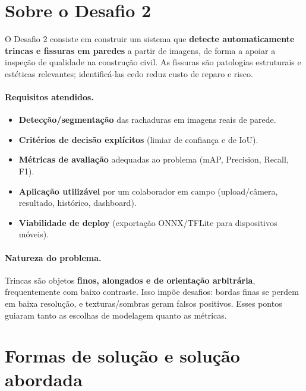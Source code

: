 \documentclass[11pt,a4paper]{article}
\begin{document}
\section{Sobre o Desafio 2}
O Desafio 2 consiste em construir um sistema que \textbf{detecte automaticamente trincas e
fissuras em paredes} a partir de imagens, de forma a apoiar a inspeção de qualidade na
construção civil. As fissuras são patologias estruturais e estéticas relevantes; identificá-las
cedo reduz custo de reparo e risco.

\paragraph{Requisitos atendidos.}
\begin{itemize}[leftmargin=1.4em]
  \item \textbf{Detecção/segmentação} das rachaduras em imagens reais de parede.
  \item \textbf{Critérios de decisão explícitos} (limiar de confiança e de IoU).
  \item \textbf{Métricas de avaliação} adequadas ao problema (mAP, Precision, Recall, F1).
  \item \textbf{Aplicação utilizável} por um colaborador em campo (upload/câmera, resultado,
        histórico, dashboard).
  \item \textbf{Viabilidade de deploy} (exportação ONNX/TFLite para dispositivos móveis).
\end{itemize}

\paragraph{Natureza do problema.} Trincas são objetos \textbf{finos, alongados e de orientação
arbitrária}, frequentemente com baixo contraste. Isso impõe desafios: bordas finas se perdem
em baixa resolução, e texturas/sombras geram falsos positivos. Esses pontos guiaram tanto as
escolhas de modelagem quanto as métricas.

\section{Formas de solução e solução abordada}
\end{document}
